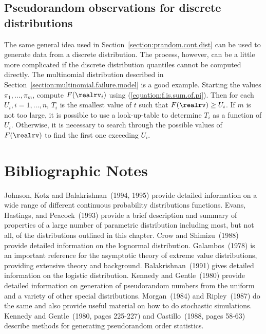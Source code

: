 \subsection{Pseudorandom observations for discrete distributions}
The same general idea 
used in Section~\ref{section:prandom.cont.dist} 
can be used to generate data from a discrete
distribution. The process, however, can be a little more
complicated if the discrete distribution quantiles cannot be computed
directly. The multinomial distribution described in
Section~\ref{section:multinomial.failure.model} is a good example.
Starting the values $\pi_{1},\dots, \pi_{m}$, compute $F(\realrv_{i})$
using (\ref{equation:f.is.sum.of.pi}). Then for each $U_{i},
i=1,\dots,n$, $T_{i}$ is the smallest value of $t$ such that
$F(\realrv) \geq U_{i}$. If $m$ is not too large, it is possible to use a
look-up-table to determine $T_{i}$ as a function of $U_{i}$.
Otherwise, it is necessary to search through the possible values of
$F(\realrv)$ to find the first one exceeding $U_{i}$.


\section*{Bibliographic Notes}
Johnson, Kotz and Balakrishnan~(1994, 1995) provide detailed
information on a wide range of different continuous probability
distributions functions.  Evans, Hastings, and Peacock~(1993) provide
a brief description and summary of properties of a large number of
parametric distribution including most, but not all, of the
distributions outlined in this chapter.  Crow and Shimizu~(1988)
provide detailed information on the lognormal distribution.
Galambos~(1978) is an important reference for the asymptotic theory of
extreme value distributions, providing extensive theory and
background.  Balakrishnan~(1991) gives detailed information on the
logistic distribution. Kennedy and Gentle~(1980) provide detailed
information on generation of pseudorandom numbers from the uniform
and a variety of other special distributions.  Morgan~(1984) and
Ripley~(1987) do the same and also provide useful material on how to
do stochastic simulations. Kennedy and Gentle~(1980, pages 225-227)
and Castillo~(1988, pages 58-63) describe methods for
generating pseudorandom order statistics.

